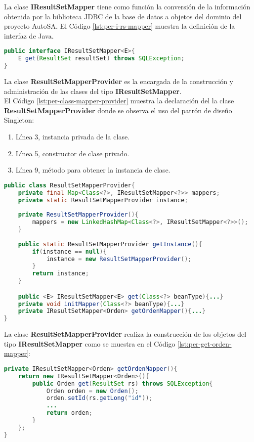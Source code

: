 La clase \textbf{IResultSetMapper} tiene como función la conversión de la información obtenida por la biblioteca JDBC de la base de datos a objetos del dominio del proyecto AutoSA. El Código \ref{lst:per-i-rs-mapper} muestra la definición de la interfaz de Java.
	\begin{lstlisting}[language=Java, caption={Interfaz IResultSetMapper.}, captionpos=b, label={lst:per-i-rs-mapper}]
public interface IResultSetMapper<E>{
	E get(ResultSet resultSet) throws SQLException;
}
	\end{lstlisting}

La clase \textbf{ResultSetMapperProvider} es la encargada de la construcción y administración de las clases del tipo \textbf{IResultSetMapper}.\\
El Código \ref{lst:per-class-mapper-provider} muestra la declaración del la clase \textbf{ResultSetMapperProvider} donde se observa el uso del patrón de diseño Singleton:
\begin{enumerate}
	\item Línea 3, instancia privada de la clase.
	\item Línea 5, constructor de clase privado.
	\item Línea 9, método para obtener la instancia de clase.
\end{enumerate}

\begin{lstlisting}[language=Java, caption={Clase ResultSetMapperProvider con patrón de diseño Singleton.}, captionpos=b, label={lst:per-class-mapper-provider}]
public class ResultSetMapperProvider{
	private final Map<Class<?>, IResultSetMapper<?>> mappers;
	private static ResultSetMapperProvider instance;
	
	private ResultSetMapperProvider(){
		mappers = new LinkedHashMap<Class<?>, IResultSetMapper<?>>();
	}
	
	public static ResultSetMapperProvider getInstance(){
		if(instance == null){
			instance = new ResultSetMapperProvider();
		}
		return instance;
	}

	public <E> IResultSetMapper<E> get(Class<?> beanType){...}
	private void initMapper(Class<?> beanType){...}
	private IResultSetMapper<Orden> getOrdenMapper(){...}
}
\end{lstlisting}

La clase \textbf{ResultSetMapperProvider} realiza la construcción de los objetos del tipo \textbf{IResultSetMapper} como se muestra en el Código \ref{lst:per-get-orden-mapper}:
\begin{lstlisting}[language=Java, caption={}, captionpos=b, label={lst:per-get-orden-mapper}]
private IResultSetMapper<Orden> getOrdenMapper(){
	return new IResultSetMapper<Orden>(){
		public Orden get(ResultSet rs) throws SQLException{
			Orden orden = new Orden();
			orden.setId(rs.getLong("id"));
			...
			return orden;
		}
	};
}
\end{lstlisting}

